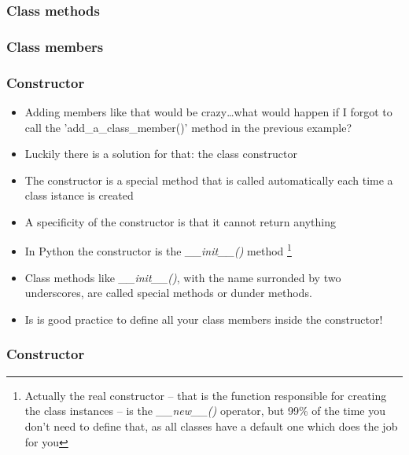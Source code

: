 \documentclass[9pt]{beamer}
\begin{document}
\begin{frame}
  \frametitle{Class methods}
  
\end{frame}


\begin{frame}
  \frametitle{Class members}
  
\end{frame}


\begin{frame}
  \frametitle{Constructor}
  
  \begin{itemize}
    \small
    \item Adding members like that would be crazy\dots what would happen if I forgot
          to call the 'add\_a\_class\_member()' method in the previous example?
    \medskip
    \item Luckily there is a solution for that: the class \alert{constructor}
    \medskip
    \item The constructor is a special method that is called automatically each time
          a class istance is created
    \medskip
    \item A specificity of the constructor is that it cannot return anything
    \medskip
    \item In Python the constructor is the \emph{\_\_init\_\_()} method%
          \footnote{Actually the real constructor -- that is the function responsible for 
                    creating the class instances -- is the \emph{\_\_new\_\_()} operator, but 99\% of the time you don't need
                    to define that, as all classes have a default one which does the job for you}           
    \medskip
    \item Class methods like \emph{\_\_init\_\_()}, with the name surronded by two underscores,
          are called \alert{special} methods or \alert{dunder} methods.
    \medskip
    \item Is is good practice to define all your class members inside the constructor!

  \end{itemize}

\end{frame}


\begin{frame}
  \frametitle{Constructor}
  
\end{frame}
\end{document}
